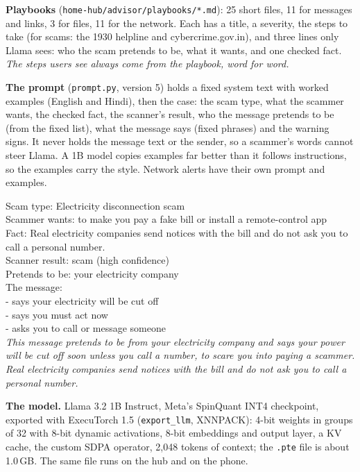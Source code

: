 \documentclass[11pt,a4paper]{article}
\newcommand{\code}[1]{\texttt{#1}}
\begin{document}
\textbf{Playbooks} (\code{home-hub/advisor/playbooks/*.md}): 25 short files, 11 for messages and links, 3 for files, 11 for the
network. Each has a title, a severity, the steps to take (for scams: the 1930 helpline and cybercrime.gov.in), and
three lines only Llama sees: who the scam pretends to be, what it wants, and one checked fact. \emph{The steps users see
always come from the playbook, word for word.}

\textbf{The prompt} (\code{prompt.py}, version 5) holds a fixed system text with worked examples (English and Hindi), then
the case: the scam type, what the scammer wants, the checked fact, the scanner's result, who the message pretends to be
(from the fixed list), what the message says (fixed phrases) and the warning signs. It never holds the message text or
the sender, so a scammer's words cannot steer Llama. A 1B model copies examples far better than it follows instructions,
so the examples carry the style. Network alerts have their own prompt and examples.

\begin{keybox}[title=Example: the case Llama is shown (prompt v5) and its answer]
\small\ttfamily
Scam type: Electricity disconnection scam\\
Scammer wants: to make you pay a fake bill or install a remote-control app\\
Fact: Real electricity companies send notices with the bill and do not ask you to call a personal number.\\
Scanner result: scam (high confidence)\\
Pretends to be: your electricity company\\
The message:\\
- says your electricity will be cut off\\
- says you must act now\\
- asks you to call or message someone\\[4pt]
\normalfont\itshape
This message pretends to be from your electricity company and says your power will be cut off soon unless you call a
number, to scare you into paying a scammer. Real electricity companies send notices with the bill and do not ask you to
call a personal number.
\end{keybox}

\textbf{The model.} Llama 3.2 1B Instruct, Meta's SpinQuant INT4 checkpoint, exported with ExecuTorch 1.5
(\code{export\_llm}, XNNPACK): 4-bit weights in groups of 32 with 8-bit dynamic activations, 8-bit embeddings and output
layer, a KV cache, the custom SDPA operator, 2,048 tokens of context; the \code{.pte} file is about 1.0\,GB. The same
file runs on the hub and on the phone.
\end{document}
